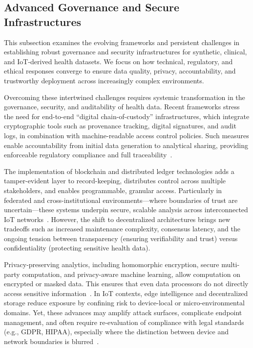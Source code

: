 \documentclass[sigconf]{acmart}
\begin{document}
\subsection{Advanced Governance and Secure Infrastructures}

This subsection examines the evolving frameworks and persistent challenges in establishing robust governance and security infrastructures for synthetic, clinical, and IoT-derived health datasets. We focus on how technical, regulatory, and ethical responses converge to ensure data quality, privacy, accountability, and trustworthy deployment across increasingly complex environments.

Overcoming these intertwined challenges requires systemic transformation in the governance, security, and auditability of health data. Recent frameworks stress the need for end-to-end “digital chain-of-custody” infrastructures, which integrate cryptographic tools such as provenance tracking, digital signatures, and audit logs, in combination with machine-readable access control policies. Such measures enable accountability from initial data generation to analytical sharing, providing enforceable regulatory compliance and full traceability~\cite{ref4, ref5, ref10, ref13, ref14, ref16, ref17, ref18, ref19, ref20, ref21, ref22, ref23, ref24, ref25, ref30, ref31, ref33, ref34, ref35, ref44, ref45, ref46, ref50, ref51, ref61, ref62, ref64, ref65, ref76, ref77, ref91, ref106}.

The implementation of blockchain and distributed ledger technologies adds a tamper-evident layer to record-keeping, distributes control across multiple stakeholders, and enables programmable, granular access. Particularly in federated and cross-institutional environments---where boundaries of trust are uncertain---these systems underpin secure, scalable analysis across interconnected IoT networks~\cite{ref4, ref5, ref10, ref13, ref14, ref16, ref17, ref18, ref19, ref20, ref21, ref22, ref23, ref24, ref25, ref30, ref31, ref33, ref34, ref35, ref44, ref45, ref46, ref50, ref51, ref61, ref62, ref64, ref65, ref76, ref77, ref91, ref106}. However, the shift to decentralized architectures brings new tradeoffs such as increased maintenance complexity, consensus latency, and the ongoing tension between transparency (ensuring verifiability and trust) versus confidentiality (protecting sensitive health data).

Privacy-preserving analytics, including homomorphic encryption, secure multi-party computation, and privacy-aware machine learning, allow computation on encrypted or masked data. This ensures that even data processors do not directly access sensitive information~\cite{ref4, ref5, ref10, ref16, ref17, ref18, ref19, ref20, ref21, ref22, ref23, ref24, ref25, ref44, ref45, ref61, ref62, ref64, ref65, ref76, ref77, ref91, ref106}. In IoT contexts, edge intelligence and decentralized storage reduce exposure by confining risk to device-local or micro-environmental domains. Yet, these advances may amplify attack surfaces, complicate endpoint management, and often require re-evaluation of compliance with legal standards (e.g., GDPR, HIPAA), especially where the distinction between device and network boundaries is blurred~\cite{ref51}.
\end{document}

